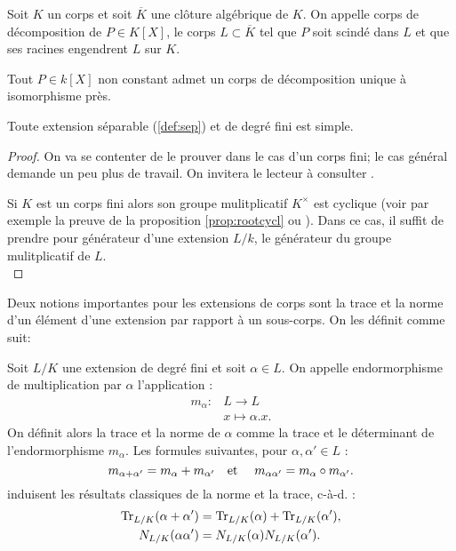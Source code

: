 \documentclass[a4paper]{article} %
\numberwithin{section}{part}
\numberwithin{equation}{section}
\newcommand\etmath{\textup{\quad et \quad}}
\begin{document}
\begin{defn}
\label{def:dec}
Soit $K$ un corps et soit $\overline{K}$ une clôture algébrique de $K$. On 
appelle corps de décomposition de $P\in K[X]$, le corps $L\subset\overline{K}$ 
tel que $P$ soit scindé dans $L$ et que ses racines engendrent $L$ sur $K$.
\end{defn}

\begin{thm}
\label{cor:dec}
Tout $P\in k[X]$ non constant admet un corps de décomposition unique à 
isomorphisme près.
\end{thm}


\begin{thm}
\label{th:elemprim}
Toute extension séparable (\ref{def:sep}) et de degré fini est simple.
\end{thm}
\begin{proof}
On va se contenter de le prouver dans le cas d'un corps fini; le cas général
demande un peu plus de travail. On invitera le lecteur à consulter
\cite[p.~87]{Esc}.\par
Si $K$ est un corps fini alors son groupe mulitplicatif $K^{\times}$ est
cyclique (voir par exemple la preuve de la proposition \ref{prop:rootcycl} ou
\cite[p.~50]{LiNi1}). Dans ce cas, il suffit de prendre pour générateur d'une
extension $L/k$, le générateur du groupe mulitplicatif de $L$.\\
\end{proof}


Deux notions importantes pour les extensions de corps sont la trace et la norme
d'un élément d'une extension par rapport à un sous-corps. On les définit comme
suit:

\begin{defn}
Soit $L/K$ une extension de degré fini et soit $\alpha\in L$. On appelle
endormorphisme de multiplication par $\alpha$ l'application :
\begin{align*}
m_{\alpha} :&L \longrightarrow L\\
&x\longmapsto\alpha.x.
\end{align*}
On définit alors la trace et la norme de $\alpha$ comme la trace et le 
déterminant de l'endormorphisme $m_{\alpha}$. Les formules suivantes, pour 
$\alpha, \alpha'\in L$ :
\begin{equation}
m_{\alpha + \alpha'} = m_{\alpha} + m_{\alpha'} \etmath
m_{\alpha\alpha'} = m_{\alpha}\circ m_{\alpha'}. 
\end{equation}
induisent les résultats classiques de la norme et la trace, c-à-d. :
\begin{align}
\textup{Tr}_{L/K}(\alpha + \alpha') &= \textup{Tr}_{L/K}(\alpha) +
\textup{Tr}_{L/K}(\alpha'),\\
N_{L/K}(\alpha\alpha') &= N_{L/K}(\alpha)N_{L/K}(\alpha').
\end{align}
\end{defn}
\end{document}
